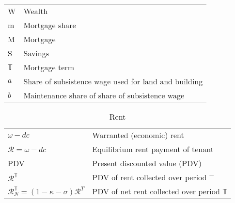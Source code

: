 \begin{longtable}{lp{10cm}}
W & Wealth \\
m & Mortgage share \\
M & Mortgage \\
S & Savings \\

$\mathbb{T}$     &  Mortgage term                     \\

$a$       &  Share of subsistence wage  used for land and building \\
$b$       &  Maintenance share of share of subsistence wage \\ %

\hline
\end{longtable}  


\begin{longtable}{lp{10cm}}
\caption{Rent}                                                            \\
\hline
$\omega-{dc}$                &  Warranted (economic) rent                \\
$\mathcal{R}=\omega-{dc}$    &  Equilibrium rent payment of tenant       \\
PDV                           &  Present discounted value (PDV)                \\  
$\mathcal{R}^\mathbb{T}$               &  PDV of rent collected over period $\mathbb{T}$    \\ 
$\mathcal{R}^\mathbb{T}_N=(1-\kappa-\sigma)\mathcal{R}^T$  &  PDV of net rent collected over period $\mathbb{T}$ \\
\hline
\end{longtable}

